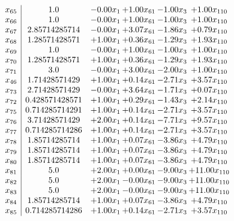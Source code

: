\documentclass[8pt]{article}
\begin{document}
\[\begin{array}{c| c c@{\hskip 2pt} c@{\hskip 2pt} c@{\hskip 2pt} c@{\hskip 2pt} }
 x_{65}   &  1.0 & -0.00 x_{1} & +  1.00 x_{61} & -1.00 x_{3} & +  1.00 x_{110}\\
 x_{66}   &  1.0 & -0.00 x_{1} & +  1.00 x_{61} & -1.00 x_{3} & +  1.00 x_{110}\\
 x_{67}   &  2.85714285714 & -0.00 x_{1} & +  3.07 x_{61} & -1.86 x_{3} & +  0.79 x_{110}\\
 x_{68}   &  1.28571428571 & +  1.00 x_{1} & +  0.36 x_{61} & -1.29 x_{3} & +  1.93 x_{110}\\
 x_{69}   &  1.0 & -0.00 x_{1} & +  1.00 x_{61} & -1.00 x_{3} & +  1.00 x_{110}\\
 x_{70}   &  1.28571428571 & +  1.00 x_{1} & +  0.36 x_{61} & -1.29 x_{3} & +  1.93 x_{110}\\
 x_{71}   &  3.0 & -0.00 x_{1} & +  3.00 x_{61} & -2.00 x_{3} & +  1.00 x_{110}\\
 x_{46}   &  1.71428571429 & +  1.00 x_{1} & +  0.14 x_{61} & -2.71 x_{3} & +  3.57 x_{110}\\
 x_{73}   &  2.71428571429 & -0.00 x_{1} & +  3.64 x_{61} & -1.71 x_{3} & +  0.07 x_{110}\\
 x_{72}   &  0.428571428571 & +  1.00 x_{1} & +  0.29 x_{61} & -1.43 x_{3} & +  2.14 x_{110}\\
 x_{75}   &  0.714285714291 & +  1.00 x_{1} & +  0.14 x_{61} & -2.71 x_{3} & +  3.57 x_{110}\\
 x_{76}   &  3.71428571429 & +  2.00 x_{1} & +  0.14 x_{61} & -7.71 x_{3} & +  9.57 x_{110}\\
 x_{77}   &  0.714285714286 & +  1.00 x_{1} & +  0.14 x_{61} & -2.71 x_{3} & +  3.57 x_{110}\\
 x_{78}   &  1.85714285714 & +  1.00 x_{1} & +  0.07 x_{61} & -3.86 x_{3} & +  4.79 x_{110}\\
 x_{79}   &  1.85714285714 & +  1.00 x_{1} & +  0.07 x_{61} & -3.86 x_{3} & +  4.79 x_{110}\\
 x_{80}   &  1.85714285714 & +  1.00 x_{1} & +  0.07 x_{61} & -3.86 x_{3} & +  4.79 x_{110}\\
 x_{81}   &  5.0 & +  2.00 x_{1} & +  0.00 x_{61} & -9.00 x_{3} & + 11.00 x_{110}\\
 x_{82}   &  5.0 & +  2.00 x_{1} & -0.00 x_{61} & -9.00 x_{3} & + 11.00 x_{110}\\
 x_{83}   &  5.0 & +  2.00 x_{1} & -0.00 x_{61} & -9.00 x_{3} & + 11.00 x_{110}\\
 x_{84}   &  1.85714285714 & +  1.00 x_{1} & +  0.07 x_{61} & -3.86 x_{3} & +  4.79 x_{110}\\
 x_{85}   &  0.714285714286 & +  1.00 x_{1} & +  0.14 x_{61} & -2.71 x_{3} & +  3.57 x_{110}\\

\end{array}\]
\end{document}
